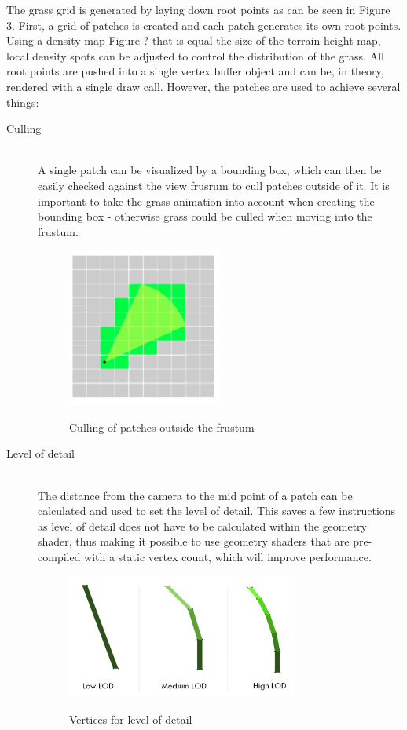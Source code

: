 \documentclass[conference]{acmsiggraph}
\begin{document}
The grass grid is generated by laying down root points as can be seen in Figure 3. First, a grid of patches is created and each patch generates its own root points. Using a density map {Figure ?} that is equal the size of the terrain height map, local density spots can be adjusted to control the distribution of the grass. All root points are pushed into a single vertex buffer object and can be, in theory, rendered with a single draw call. However, the patches are used to achieve several things:

\begin{description}
  \item[Culling] \hfill \\
  A single patch can be visualized by a bounding box, which can then be easily checked against the view frusrum to cull patches outside of it. It is important to take the grass animation into account when creating the bounding box - otherwise grass could be culled when moving into the frustum.
   \begin{figure}[ht]
   \centering
   \includegraphics[width=2.0in]{images/culling}
   \caption{Culling of patches outside the frustum} \cite{EddieLee}
 \end{figure}    
  
  \item[Level of detail] \hfill \\
  The distance from the camera to the mid point of a patch can be calculated and used to set the level of detail. This saves a few instructions as level of detail does not have to be calculated within the geometry shader, thus making it possible to use geometry shaders that are pre-compiled with a static vertex count, which will improve performance.

 \begin{figure}[ht]
   \centering
   \includegraphics[width=3.0in]{images/lod}
   \caption{Vertices for level of detail} \cite{EddieLee}
 \end{figure}  
  

\end{description}
\end{document}
